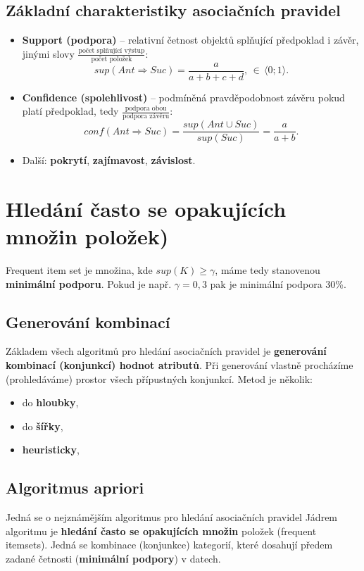 \subsection{Základní charakteristiky asociačních pravidel}
\begin{itemize}
    \item \textbf{Support (podpora)} -- relativní četnost objektů splňující předpoklad i závěr, jinými slovy {\scriptsize$\frac{\textrm{počet splňující výstup}}{\textrm{počet položek}}$}:
          \begin{equation}
              sup(Ant \Rightarrow Suc) = \frac{a}{a + b + c + d}, \, \in \, \langle 0; 1 \rangle.
          \end{equation}
    \item \textbf{Confidence (spolehlivost)} -- podmíněná pravděpodobnost závěru pokud platí předpoklad, tedy {\scriptsize$\frac{\textrm{podpora obou}}{\textrm{podpora závěru}}$}:
          \begin{equation}
              conf(Ant \Rightarrow Suc) = \frac{sup(Ant \cup Suc)}{sup(Suc)} = \frac{a}{a + b}.
          \end{equation}
    \item Další: \textbf{pokrytí}, \textbf{zajímavost}, \textbf{závislost}.
\end{itemize}

\section{Hledání často se opakujících množin položek)}
Frequent item set je množina, kde $sup(K) \geq \gamma$, máme tedy stanovenou \textbf{minimální podporu}. Pokud je např. $\gamma = 0,3$ pak je minimální podpora 30\%.

\subsection{Generování kombinací}
Základem všech algoritmů pro hledání asociačních pravidel je \textbf{generování kombinací (konjunkcí) hodnot atributů}. Při generování vlastně procházíme (prohledáváme) prostor všech přípustných konjunkcí. Metod je několik:
\begin{itemize}
    \item do \textbf{hloubky},
    \item do \textbf{šířky},
    \item \textbf{heuristicky},
\end{itemize}

\subsection{Algoritmus apriori}
Jedná se o nejznámějším algoritmus pro hledání asociačních pravidel Jádrem algoritmu je \textbf{hledání často se opakujících množin} položek (frequent itemsets). Jedná se kombinace (konjunkce) kategorií, které dosahují předem zadané četnosti (\textbf{minimální podpory}) v datech.

